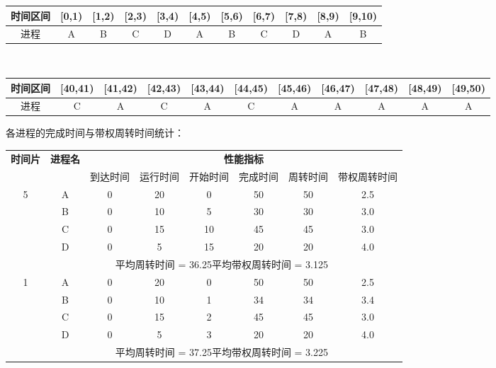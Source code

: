\begin{center}
\fontsize{8pt}{11pt}\selectfont
\renewcommand{\arraystretch}{1.15}
\begin{tabular}{|c|c|c|c|c|c|c|c|c|c|c|}
\hline
时间区间 & [0,1) & [1,2) & [2,3) & [3,4) & [4,5) & [5,6) & [6,7) & [7,8) & [8,9) & [9,10) \\ \hline
进程 & A & B & C & D & A & B & C & D & A & B \\ \hline
\end{tabular}\\[2pt]
\fontsize{8pt}{11pt}\selectfont
\begin{tabular}{|c|c|c|c|c|c|c|c|c|c|c|}
\hline
时间区间 & [40,41) & [41,42) & [42,43) & [43,44) & [44,45) & [45,46) & [46,47) & [47,48) & [48,49) & [49,50) \\ \hline
进程 & C & A & C & A & C & A & A & A & A & A \\ \hline
\end{tabular}
\end{center}
\noindent\hspace*{2em}各进程的完成时间与带权周转时间统计：\par
\begin{center}
\fontsize{9pt}{12pt}\selectfont
\renewcommand{\arraystretch}{1.3}
\begin{tabular}{|c|c|c|c|c|c|c|c|}
\hline
\multirow{2}{*}{\textbf{时间片}} & \multirow{2}{*}{\textbf{进程名}} & \multicolumn{6}{c|}{\textbf{性能指标}} \\ \cline{3-8}
 & & 到达时间 & 运行时间 & 开始时间 & 完成时间 & 周转时间 & 带权周转时间 \\ \hline
\multirow{4}{*}{5} & A & 0 & 20 & 0 & 50 & 50 & 2.5 \\ \cline{2-8}
 & B & 0 & 10 & 5 & 30 & 30 & 3.0 \\ \cline{2-8}
 & C & 0 & 15 & 10 & 45 & 45 & 3.0 \\ \cline{2-8}
 & D & 0 & 5 & 15 & 20 & 20 & 4.0 \\ \hline
\multicolumn{7}{|r|}{平均周转时间 = 36.25\quad 平均带权周转时间 = 3.125} & \\ \hline
\multirow{4}{*}{1} & A & 0 & 20 & 0 & 50 & 50 & 2.5 \\ \cline{2-8}
 & B & 0 & 10 & 1 & 34 & 34 & 3.4 \\ \cline{2-8}
 & C & 0 & 15 & 2 & 45 & 45 & 3.0 \\ \cline{2-8}
 & D & 0 & 5 & 3 & 20 & 20 & 4.0 \\ \hline
\multicolumn{7}{|r|}{平均周转时间 = 37.25\quad 平均带权周转时间 = 3.225} & \\ \hline
\end{tabular}
\end{center}
